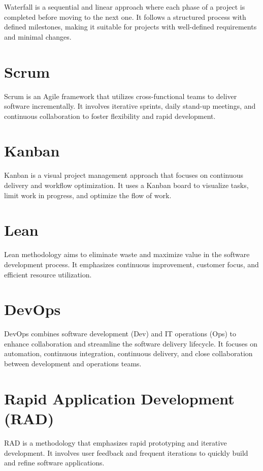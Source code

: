 Waterfall is a sequential and linear approach where each phase of a project is completed before moving to the next one. It follows a structured process with defined milestones, making it suitable for projects with well-defined requirements and minimal changes.

\section{Scrum}

Scrum is an Agile framework that utilizes cross-functional teams to deliver software incrementally. It involves iterative sprints, daily stand-up meetings, and continuous collaboration to foster flexibility and rapid development.

\section{Kanban}

Kanban is a visual project management approach that focuses on continuous delivery and workflow optimization. It uses a Kanban board to visualize tasks, limit work in progress, and optimize the flow of work.

\section{Lean}

Lean methodology aims to eliminate waste and maximize value in the software development process. It emphasizes continuous improvement, customer focus, and efficient resource utilization.

\section{DevOps}

DevOps combines software development (Dev) and IT operations (Ops) to enhance collaboration and streamline the software delivery lifecycle. It focuses on automation, continuous integration, continuous delivery, and close collaboration between development and operations teams.

\section{Rapid Application Development (RAD)}

RAD is a methodology that emphasizes rapid prototyping and iterative development. It involves user feedback and frequent iterations to quickly build and refine software applications.

